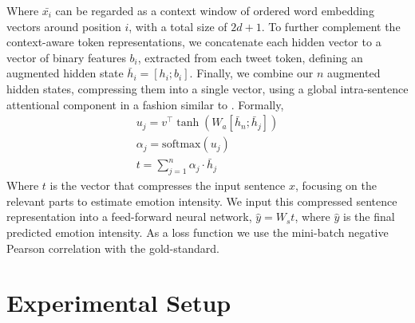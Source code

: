 \documentclass[11pt,letterpaper]{article}
\begin{document}
Where $\bar{x_i}$ can be regarded as a context window of ordered word embedding vectors around position $i$, with a total size of $2d+1$.  To further complement the context-aware token representations, we concatenate each hidden vector to a vector of binary features $b_i$, extracted from each tweet token, defining an augmented hidden state $\bar h_i = [h_i ; b_i]$. Finally, we combine our $n$ augmented hidden states, compressing them into a single vector, using a global intra-sentence attentional component in a fashion similar to . Formally, 
\begin{eqnarray}
u_{j} = v^{\top} \tanh(W_a [\bar h_n;\bar h_j]) \\
\alpha_{j} = \mathrm{softmax}(u_{j}) \\
t = \sum_{j=1}^n \alpha_{j} \cdot \bar h_j
\end{eqnarray}
Where $t$ is the vector that compresses the input sentence $x$, focusing on the relevant parts to estimate emotion intensity. We input this compressed sentence representation into a feed-forward neural network, $\hat y = W_{s} t$, where $\hat y$ is the final predicted emotion intensity. As a loss function we use the mini-batch negative Pearson correlation with the gold-standard.


%	
%	



\section{Experimental Setup}
\end{document}
